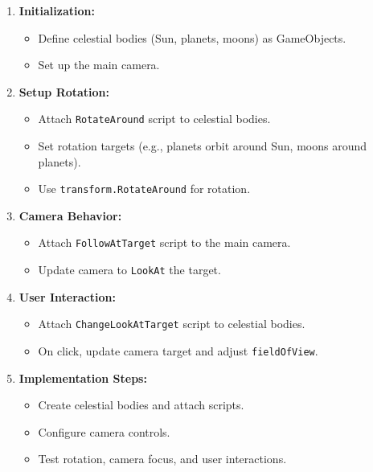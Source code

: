 \begin{enumerate}
    \item \textbf{Initialization:}
    \begin{itemize}
        \item Define celestial bodies (Sun, planets, moons) as GameObjects.
        \item Set up the main camera.
    \end{itemize}
    
    \item \textbf{Setup Rotation:}
    \begin{itemize}
        \item Attach \texttt{RotateAround} script to celestial bodies.
        \item Set rotation targets (e.g., planets orbit around Sun, moons around planets).
        \item Use \texttt{transform.RotateAround} for rotation.
    \end{itemize}
    
    \item \textbf{Camera Behavior:}
    \begin{itemize}
        \item Attach \texttt{FollowAtTarget} script to the main camera.
        \item Update camera to \texttt{LookAt} the target.
    \end{itemize}
    
    \item \textbf{User Interaction:}
    \begin{itemize}
        \item Attach \texttt{ChangeLookAtTarget} script to celestial bodies.
        \item On click, update camera target and adjust \texttt{fieldOfView}.
    \end{itemize}
    
    \item \textbf{Implementation Steps:}
    \begin{itemize}
        \item Create celestial bodies and attach scripts.
        \item Configure camera controls.
        \item Test rotation, camera focus, and user interactions.
    \end{itemize}
    
\end{enumerate}


